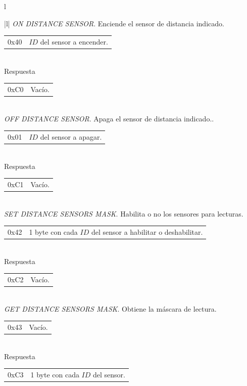 \begin{table}
	\begin{center}
		\begin{tabular}{l}
			\begin{tabular}{|l|}
				\hline
				\emph{ON DISTANCE SENSOR}. Enciende el sensor de distancia indicado. \\
				\hline
				\begin{tabular}{c|l}
					0x40 & $ID$ del sensor a encender. \\
				\end{tabular}
				\\
				\hline
				Respuesta \\
				\hline
				\begin{tabular}{c|l}
					0xC0 & Vac\'io. \\
				\end{tabular}
				\\
	
				\hline\hline
				\emph{OFF DISTANCE SENSOR}. Apaga el sensor de distancia indicado.. \\
				\hline
				\begin{tabular}{c|l}
					0x01 & $ID$ del sensor a apagar.\\
				\end{tabular}
				\\
				\hline
				Respuesta \\
				\hline
				\begin{tabular}{c|l}
					0xC1 & Vac\'io. \\
				\end{tabular}
				\\
	
				\hline\hline
				\emph{SET DISTANCE SENSORS MASK}. Habilita o no los sensores para lecturas. \\
				\hline
				\begin{tabular}{c|l}
					0x42 & 1 byte con cada $ID$ del sensor a habilitar o deshabilitar.\\
				\end{tabular}
				\\
				\hline
				Respuesta \\
				\hline
				\begin{tabular}{c|l}
					0xC2 & Vac\'io. \\
				\end{tabular}
				\\
	
				\hline\hline
				\emph{GET DISTANCE SENSORS MASK}. Obtiene la m\'ascara de lectura. \\
				\hline
				\begin{tabular}{c|l}
					0x43 & Vac\'io. \\
				\end{tabular}
				\\
				\hline
				Respuesta \\
				\hline
				\begin{tabular}{c|l}
					0xC3 & 1 byte con cada $ID$ del sensor.\\
				\end{tabular}
				\\
	

\end{tabular}
\end{tabular}
\end{center}
\end{table}
